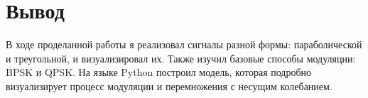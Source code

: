 \chapter{Вывод}
\label{ch:chap3}

В ходе проделанной работы я реализовал сигналы разной формы: параболической и треугольной, и визуализировал их.
Также изучил базовые способы модуляции: BPSK и QPSK. На языке Python построил модель, которая подробно визуализирует процесс модуляции
и перемножения с несущим колебанием.
\endinput